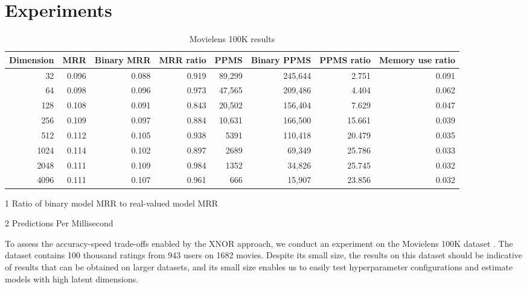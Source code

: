 \documentclass[sigchi]{acmart}
\begin{document}
\section{Experiments}
\begin{table*}[htbp]
\begin{threeparttable}
\caption{Movielens 100K results}
\label{tb:results}
\centering
\begin{tabular}{rrrrrrrr}
\toprule
Dimension &   MRR & Binary MRR & MRR ratio\tnote{1} &   PPMS\tnote{2} & Binary PPMS & PPMS ratio & Memory use ratio \\
\midrule
       32 & 0.096 &      0.088 &     0.919 & 89,299 &     245,644 &      2.751 &            0.091 \\
       64 & 0.098 &      0.096 &     0.973 & 47,565 &     209,486 &      4.404 &            0.062 \\
      128 & 0.108 &      0.091 &     0.843 & 20,502 &     156,404 &      7.629 &            0.047 \\
      256 & 0.109 &      0.097 &     0.884 & 10,631 &     166,500 &     15.661 &            0.039 \\
      512 & 0.112 &      0.105 &     0.938 &   5391 &     110,418 &     20.479 &            0.035 \\
     1024 & 0.114 &      0.102 &     0.897 &   2689 &      69,349 &     25.786 &            0.033 \\
     2048 & 0.111 &      0.109 &     0.984 &   1352 &      34,826 &     25.745 &            0.032 \\
     4096 & 0.111 &      0.107 &     0.961 &    666 &      15,907 &     23.856 &            0.032 \\
\bottomrule
\end{tabular}
\begin{tablenotes}
\small{
\item[1] Ratio of binary model MRR to real-valued model MRR
\item[2] Predictions Per Millisecond
}
\end{tablenotes}
\end{threeparttable}
\end{table*}
To assess the accuracy-speed trade-offs enabled by the XNOR approach, we conduct an experiment on the Movielens 100K dataset \citep{harper2016movielens}. The dataset contains 100 thousand ratings from 943 users on 1682 movies. Despite its small size, the results on this dataset should be indicative of results that can be obtained on larger datasets, and its small size enables us to easily test hyperparameter configurations and estimate models with high latent dimensions.
\end{document}
